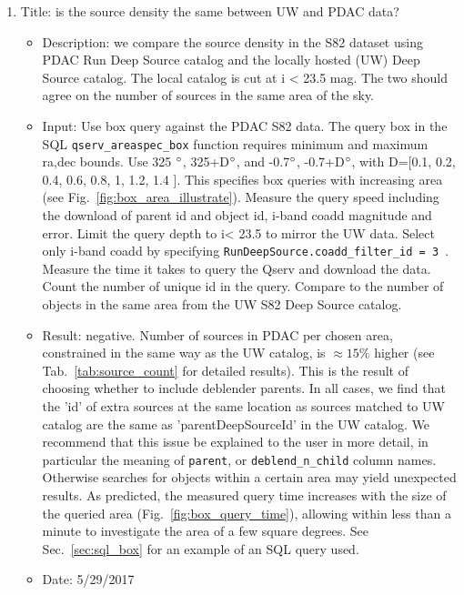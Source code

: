 \documentclass[DM,lsstdraft,toc]{lsstdoc}
\begin{document}
\begin{enumerate}
  \item Title: is the source density the same between UW and PDAC data?
  \begin{itemize}
    \item Description: we compare the source density in the S82 dataset using PDAC Run Deep Source catalog and the locally hosted (UW) Deep Source catalog. The local catalog is cut at i < 23.5 mag.  The two should agree on the number of sources in the same area of the sky.
    \item Input: Use box query against the PDAC S82 data. The query box in the SQL \verb|qserv_areaspec_box| function requires minimum and maximum ra,dec bounds.  Use 325 $\degree$, 325+D$\degree$, and -0.7$\degree$, -0.7+D$\degree$, with D=[0.1, 0.2, 0.4, 0.6, 0.8, 1, 1.2, 1.4 ]. This specifies box queries with increasing area (see Fig.~\ref{fig:box_area_illustrate}). Measure the query speed including the download of  parent id and object id,  i-band coadd magnitude and error. Limit the query depth to i< 23.5 to mirror the UW data. Select only i-band coadd by specifying \verb|RunDeepSource.coadd_filter_id = 3 |. Measure the time it takes to query the Qserv and download the data. Count the number of unique id in the query. Compare to the number of objects in the same area from the UW S82 Deep Source catalog.
    \item Result: negative. Number of sources in PDAC per chosen area, constrained in the same way as the UW catalog, is $\approx15\% $ higher (see Tab.~\ref{tab:source_count} for detailed results). This is the result of choosing whether to include deblender parents. In all cases, we find that the 'id' of extra sources at the same location as sources matched to UW catalog are the same as 'parentDeepSourceId' in the UW catalog.   We recommend that this issue  be explained to the user in more detail, in particular the meaning of  \verb|parent|, or \verb|deblend_n_child| column names. Otherwise searches for objects within a certain area may yield unexpected results.  As predicted, the measured query  time increases with the size of the queried area (Fig.~\ref{fig:box_query_time}), allowing within less than a minute to investigate the area of a few square degrees. See Sec.~\ref{sec:sql_box} for an example of an SQL query used.
    \item Date: 5/29/2017
    \end{itemize}
\end{enumerate}
\end{document}
